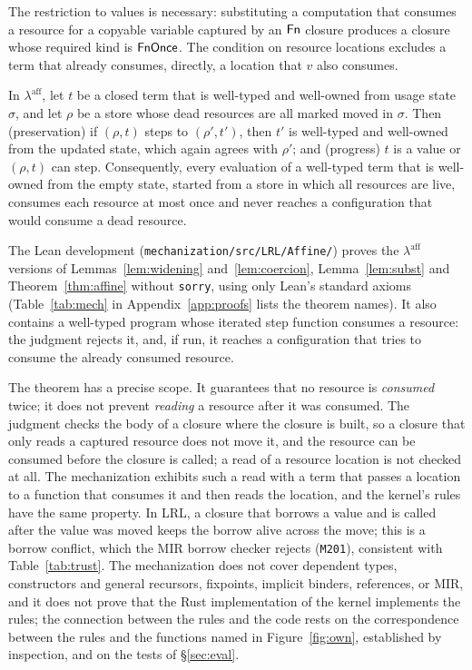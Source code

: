 The restriction to values is necessary: substituting a computation that consumes a resource for a copyable variable captured by an $\mathsf{Fn}$ closure produces a closure whose required kind is $\mathsf{FnOnce}$.
The condition on resource locations excludes a term that already consumes, directly, a location that $v$ also consumes.

\begin{theorem}\label{thm:affine}
In $\lambda^{\mathrm{aff}}$, let $t$ be a closed term that is well-typed and well-owned from usage state $\sigma$, and let $\rho$ be a store whose dead resources are all marked moved in $\sigma$.
Then (preservation) if $(\rho, t)$ steps to $(\rho', t')$, then $t'$ is well-typed and well-owned from the updated state, which again agrees with $\rho'$; and (progress) $t$ is a value or $(\rho, t)$ can step.
Consequently, every evaluation of a well-typed term that is well-owned from the empty state, started from a store in which all resources are live, consumes each resource at most once and never reaches a configuration that would consume a dead resource.
\end{theorem}

The Lean development (\texttt{mechanization/\allowbreak src/\allowbreak LRL/\allowbreak Affine/}) proves the $\lambda^{\mathrm{aff}}$ versions of Lemmas~\ref{lem:widening} and~\ref{lem:coercion}, Lemma~\ref{lem:subst} and Theorem~\ref{thm:affine} without \lstinline|sorry|, using only Lean's standard axioms (Table~\ref{tab:mech} in Appendix~\ref{app:proofs} lists the theorem names).
It also contains a well-typed program whose iterated step function consumes a resource: the judgment rejects it, and, if run, it reaches a configuration that tries to consume the already consumed resource.

The theorem has a precise scope.
It guarantees that no resource is \emph{consumed} twice; it does not prevent \emph{reading} a resource after it was consumed.
The judgment checks the body of a closure where the closure is built, so a closure that only reads a captured resource does not move it, and the resource can be consumed before the closure is called; a read of a resource location is not checked at all.
The mechanization exhibits such a read with a term that passes a location to a function that consumes it and then reads the location, and the kernel's rules have the same property.
In LRL, a closure that borrows a value and is called after the value was moved keeps the borrow alive across the move; this is a borrow conflict, which the MIR borrow checker rejects (\texttt{M201}), consistent with Table~\ref{tab:trust}.
The mechanization does not cover dependent types, constructors and general recursors, fixpoints, implicit binders, references, or MIR, and it does not prove that the Rust implementation of the kernel implements the rules; the connection between the rules and the code rests on the correspondence between the rules and the functions named in Figure~\ref{fig:own}, established by inspection, and on the tests of \S\ref{sec:eval}.
